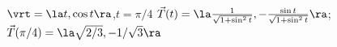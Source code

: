{$\vrt = \la t,\cos t\ra$,\quad $t=\pi/4$
}
{$\vec T(t) = \la \frac{1}{\sqrt{1+\sin^2t}},-\frac{\sin t}{\sqrt{1+\sin^2t}} \ra$;
$\vec T(\pi/4) = \la \sqrt{2/3}, -1/\sqrt{3}\ra$
}